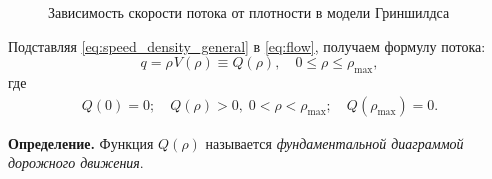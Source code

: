 \documentclass[12pt,a4paper]{article}
\begin{document}
\begin{figure}[h!]
\centering
{}
\caption{Зависимость скорости потока от плотности в модели Гриншилдса}
\label{fig:greenshields-speed-density}
\end{figure}
Подставляя \eqref{eq:speed_density_general} в \eqref{eq:flow}, получаем формулу потока:
\begin{equation}
q = \rho \hspace{1pt} V(\rho) \equiv Q(\rho), 
\quad 0 \leq \rho \leq \rho_{\max},
\label{eq:fundamental_diagram_general}
\end{equation}
где
\begin{align*}
Q(0)=0; \quad Q(\rho)>0,\; 0<\rho<\rho_{\max}; \quad Q(\rho_{\max})=0.
\end{align*}

\goodbreak
\noindent
\textbf{Определение.}
Функция $Q(\rho)$ называется \textit{фундаментальной диаграммой дорожного движения}.
\end{document}
